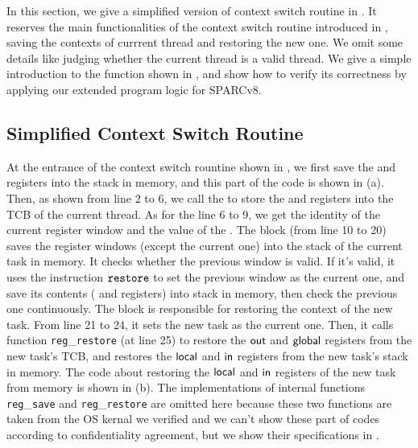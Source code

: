In this section, we give a simplified version of context switch routine in 
\Fig{\ref{fig:Main function of context switch routine}}. It reserves the 
main functionalities of the context switch routine introduced in 
\Sec{\ref{sec:ctxswitch}}, \eg saving the contexts of currrent thread 
and restoring the new one. We omit some details like judging whether the 
current thread is a valid thread. We give a simple introduction to the 
function shown in \Fig{\ref{fig:Main function of context switch routine}}, 
and show how to verify its correctness by applying our extended program 
logic for SPARCv8. 

\subsection{Simplified Context Switch Routine}

At the entrance of the context switch rountine shown in
\Fig{\ref{fig:Main function of context switch routine}}, we first 
save the \localRN{} and \inRN{} registers into the stack in memory, 
and this part of the code is shown in 
\Fig{\ref{fig:code for saving and restoring local and in}}(a). 
Then, as shown from line 2 to 6, we call the \regsave{}  
to store the \outRN{} and \globalRN{} registers into the TCB 
of the current thread. As for the line 6 to 9, we get the identity of 
the current register window and the value of the \regwim{}. 
The block \SaveUsedWin{} (from line 10 to 20) saves the register windows 
(except the current one) into the stack of the current task in memory. 
It checks whether the previous window is valid. If it's valid, it 
uses the instruction $\texttt{restore}{}$ to set the previous window as the 
current one, and save its contents (\localRN{} and \inRN{} registers)
into stack in memory, then check the previous one continuously. 
The block \SwitchNewTask{} is responsible 
for restoring the context of the new task. From line 21 to 24, it 
sets the new task as the current one. Then, it calls function 
\texttt{reg}\_\texttt{restore} (at line 25)
to restore the $\textsf{out}$ and $\textsf{global}$ 
registers from the new task's TCB, and restores the  
$\textsf{local}$ and $\textsf{in}$ registers from the new task's stack in memory. 
The code about restoring the $\textsf{local}$ and $\textsf{in}$ registers of 
the new task from memory is shown in 
\Fig{\ref{fig:code for saving and restoring local and in}}(b). 
The implementations of internal functions
\texttt{reg}\_\texttt{save} and \texttt{reg}\_\texttt{restore} 
are omitted here because these two functions are taken 
from the OS kernal we verified and we can't show these part 
of codes according to confidentiality agreement, but we show 
their specifications in \Fig{\ref{fig:Specifications of Internal Functions}}.

